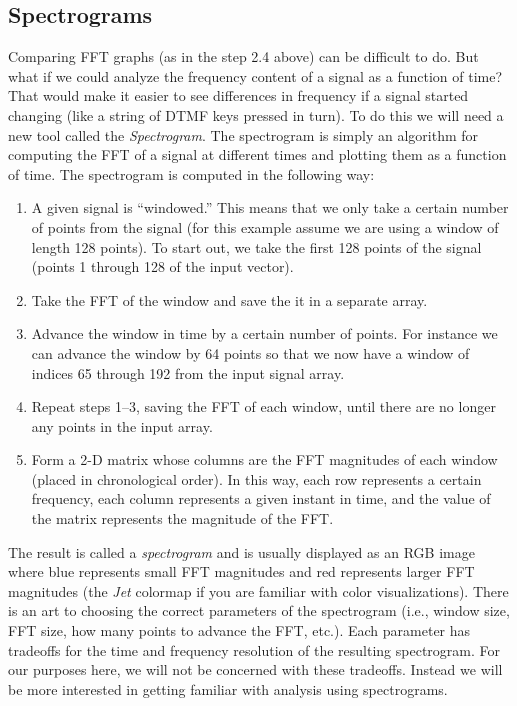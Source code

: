 \subsection{Spectrograms}

Comparing FFT graphs (as in the step 2.4 above) can be difficult to
do. But what if we could analyze the frequency content of a signal as
a function of time? That would make it easier to see differences in
frequency if a signal started changing (like a string of DTMF keys
pressed in turn). To do this we will need a new tool called the
\emph{Spectrogram}. The spectrogram is simply an algorithm for
computing the FFT of a signal at different times and plotting them as
a function of time. The spectrogram is computed in the following way:

\begin{enumerate}
\item A given signal is ``windowed.'' This means that we only take a
  certain number of points from the signal (for this example assume we
  are using a window of length 128 points). To start out, we take the
  first 128 points of the signal (points 1 through 128 of the input
  vector).
\item Take the FFT of the window and save the it in a separate array.
\item Advance the window in time by a certain number of points. For
  instance we can advance the window by 64 points so that we now have
  a window of indices 65 through 192 from the input signal array.
\item Repeat steps 1--3, saving the FFT of each window, until there
  are no longer any points in the input array.
\item Form a 2-D matrix whose columns are the FFT magnitudes of each
  window (placed in chronological order). In this way, each row
  represents a certain frequency, each column represents a given
  instant in time, and the value of the matrix represents the
  magnitude of the FFT.
\end{enumerate}

The result is called a \emph{spectrogram} and is usually displayed as
an RGB image where blue represents small FFT magnitudes and red
represents larger FFT magnitudes (the \emph{Jet} colormap if you are
familiar with color visualizations). There is an art to choosing the
correct parameters of the spectrogram (i.e., window size, FFT size,
how many points to advance the FFT, etc.). Each parameter has
tradeoffs for the time and frequency resolution of the resulting
spectrogram. For our purposes here, we will not be concerned with
these tradeoffs. Instead we will be more interested in getting
familiar with analysis using spectrograms.

